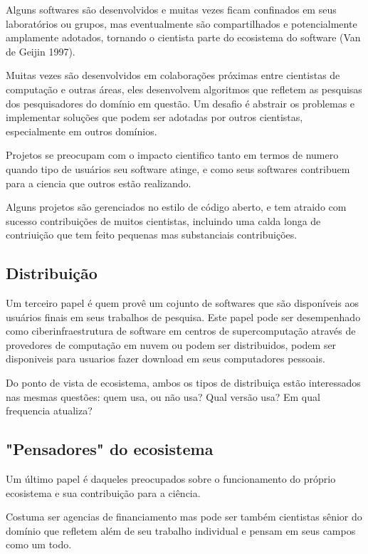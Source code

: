 Alguns softwares são desenvolvidos e muitas vezes ficam confinados em seus laboratórios
ou grupos, mas eventualmente são compartilhados e potencialmente amplamente adotados, tornando
o cientista parte do ecosistema do software (Van de Geijin 1997).

Muitas vezes são desenvolvidos em colaborações próximas entre cientistas de computação e
outras áreas, eles desenvolvem algoritmos que refletem as pesquisas dos pesquisadores
do domínio em questão. Um desafio é abstrair os problemas e implementar soluções que
podem ser adotadas por outros cientistas, especialmente em outros domínios.

Projetos se preocupam com o impacto cientifico tanto em termos de numero quando
tipo de usuários seu software atinge, e como seus softwares contribuem para a
ciencia que outros estão realizando.

Alguns projetos são gerenciados no estilo de código aberto, e tem
atraido com sucesso contribuições de muitos cientistas, incluindo
uma calda longa de contriuição que tem feito pequenas mas substanciais
contribuições.

\subsection{Distribuição}

Um terceiro papel é quem provê um cojunto de softwares que são
disponíveis aos usuários finais em seus trabalhos de pesquisa.
Este papel pode ser desempenhado como ciberinfraestrutura de software
em centros de supercomputação através de provedores de computação
em nuvem ou podem ser distribuidos, podem ser disponiveis para usuarios
fazer download em seus computadores pessoais.

Do ponto de vista de ecosistema, ambos os tipos de distribuiça
estão interessados nas mesmas questões: quem usa, ou não usa?
Qual versão usa? Em qual frequencia atualiza?

\subsection{"Pensadores" do ecosistema}

Um último papel é daqueles preocupados sobre o funcionamento do
próprio ecosistema e sua contribuição para a ciência.

Costuma ser agencias de financiamento mas pode ser também cientistas sênior do
domínio que refletem além de seu trabalho individual e pensam em seus campos
como um todo.

